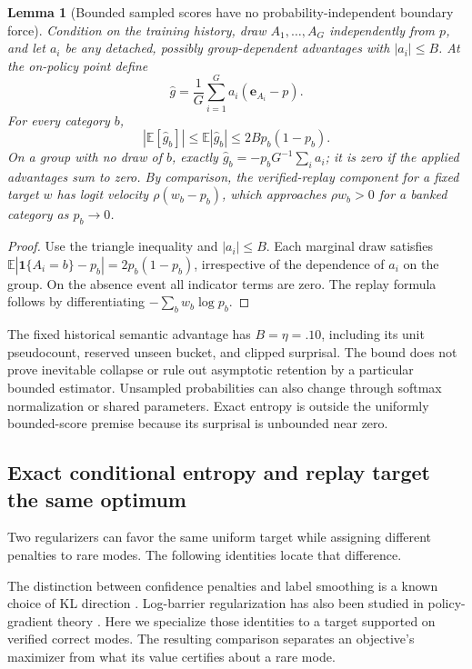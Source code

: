 \documentclass{article}
\newcommand{\1}{\mathbf 1}
\newcommand{\E}{\mathbb E}
\newtheorem{lemma}{Lemma}[section]
\theoremstyle{remark}
\theoremstyle{definition}
\theoremstyle{plain}
\begin{document}
\begin{lemma}[Bounded sampled scores have no probability-independent boundary force]
\label{lem:sampled-score-bound}
Condition on the training history, draw $A_1,\ldots,A_G$ independently from
$p$, and let $a_i$ be any detached, possibly group-dependent advantages with
$|a_i|\le B$. At the on-policy point define
\[
 \widehat g=\frac1G\sum_{i=1}^G a_i(\mathbf e_{A_i}-p).
\]
For every category $b$,
\[
 |\E[\widehat g_b]|\le\E|\widehat g_b|
 \le 2B p_b(1-p_b).
\]
On a group with no draw of $b$, exactly
$\widehat g_b=-p_bG^{-1}\sum_i a_i$; it is zero if the applied advantages
sum to zero. By comparison, the verified-replay component for a fixed target
$w$ has logit velocity $\rho(w_b-p_b)$, which approaches $\rho w_b>0$
for a banked category as $p_b\to0$.
\end{lemma}

\begin{proof}
Use the triangle inequality and $|a_i|\le B$. Each marginal draw satisfies
$\E|\1\{A_i=b\}-p_b|=2p_b(1-p_b)$, irrespective of the dependence of
$a_i$ on the group. On the absence event all indicator terms are zero.
The replay formula follows by differentiating $-\sum_b w_b\log p_b$.
\end{proof}

The fixed historical semantic advantage has $B=\eta=.10$, including its
unit pseudocount, reserved unseen bucket, and clipped surprisal. The bound
does not prove inevitable collapse or rule out asymptotic retention by a
particular bounded estimator. Unsampled probabilities can also change through
softmax normalization or shared parameters. Exact entropy is outside the
uniformly bounded-score premise because its surprisal is unbounded near zero.

\subsection{Exact conditional entropy and replay target the same optimum}
\label{app:theory-entropy-comparison}

Two regularizers can favor the same uniform target while assigning different
penalties to rare modes. The following identities locate that difference.


The distinction between confidence penalties and label smoothing is a known
choice of KL direction \citep[Section~3.2]{pereyra2017confidencepenalty}.
Log-barrier regularization has also been studied in policy-gradient theory
\citep[Section~5.2]{agarwal2021policygradient}. Here we specialize those
identities to a target supported on verified correct modes. The resulting
comparison separates an objective's maximizer from what its value certifies
about a rare mode.
\end{document}

